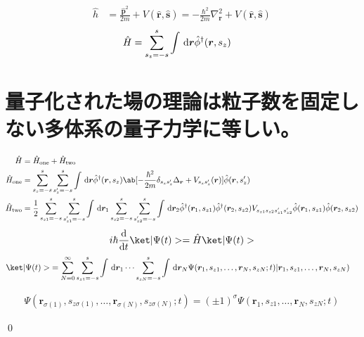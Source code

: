 \documentclass[uplatex,dvipdfmx,a4paper,11pt]{jlreq}
\makeatletter
\newcommand{\rr}{\bm{r}}
\newcommand{\pp}{\bm{p}}
\renewcommand{\ss}{\bm{s}}
\numberwithin{equation}{section}
\theoremstyle{definition}
\renewenvironment{proof}[1][\proofname]{\par
  \normalfont
  \topsep6\p@\@plus6\p@ \trivlist
  \item[\hskip\labelsep{\bfseries #1}\@addpunct{\bfseries}]\ignorespaces\quad\par
}{
  \qed\endtrivlist\@endpefalse
}
\renewcommand\proofname{証明}
\makeatother
\begin{document}
\begin{example}
  \begin{align}
    \hat{h} & = \frac{\hat{\pp}^2}{2m} + V(\hat{\rr}, \hat{\ss}) = -\frac{\hbar^2}{2m}\nabla_{\rr}^2 + V(\hat{\rr}, \hat{\ss})
  \end{align}
  \begin{align}
    \hat{H} & = \sum_{s_z = -s}^{s}\int\dl{\rr}\hat{\phi}^\dagger(\rr, s_z)
  \end{align}
\end{example}

\section{量子化された場の理論は粒子数を固定しない多体系の量子力学に等しい。}
\begin{definition}
  \begin{align}
    \hat{H}                & = \hat{H}_{\mathrm{one}} + \hat{H}_{\mathrm{two}}                                                                                                                                                                                                                                     \\
    \hat{H}_{\mathrm{one}} & = \sum_{s_z = -s}^{s}\sum_{s_z' = -s}^{s}\int\dl{\rr}\hat{\phi}^\dagger(\rr, s_z)\ab[-\frac{\hbar^2}{2m}\delta_{s_zs_z'}\Delta_{\rr} + V_{s_zs_z'}(\rr)]\hat{\phi}(\rr, s_z')                                                                                                         \\
    \hat{H}_{\mathrm{two}} & = \frac{1}{2}\sum_{s_{z1} = -s}^{s}\sum_{s_{z1}' = -s}^{s}\int\dl{\rr_1}\sum_{s_{z2} = -s}^{s}\sum_{s_{z2}' = -s}^{s}\int\dl{\rr_2}\hat{\phi}^\dagger(\rr_1, s_{z1})\hat{\phi}^\dagger(\rr_2, s_{z2})V_{s_{z1}s_{z2}s_{z1}'s_{z2}'}\hat{\phi}(\rr_1, s_{z1})\hat{\phi}(\rr_2, s_{z2})
  \end{align}
  \begin{align}
    i\hbar\diff{}{t}\ket|\Psi(t)> = \hat{H}\ket|\Psi(t)>
  \end{align}
  \begin{align}
    \ket|\Psi(t)> & = \sum_{N=0}^{\infty}\sum_{s_{z1} = -s}^{s}\int\dl{\rr_1}\cdots\sum_{s_{zN} = -s}^{s}\int\dl{\rr_N}\Psi(\rr_1,s_{z1},\ldots,\rr_N,s_{zN};t)|\rr_1,s_{z1},\ldots,\rr_N,s_{zN})
  \end{align}
\end{definition}
\begin{theorem}
  \begin{align}
    \Psi(\rr_{\sigma(1)},s_{z\sigma(1)},\ldots,\rr_{\sigma(N)},s_{z\sigma(N)};t) = (\pm 1)^\sigma\Psi(\rr_1, s_{z1},\ldots,\rr_N,s_{zN}; t)
  \end{align}
\end{theorem}
\begin{proof}

\end{proof}
\end{document}
